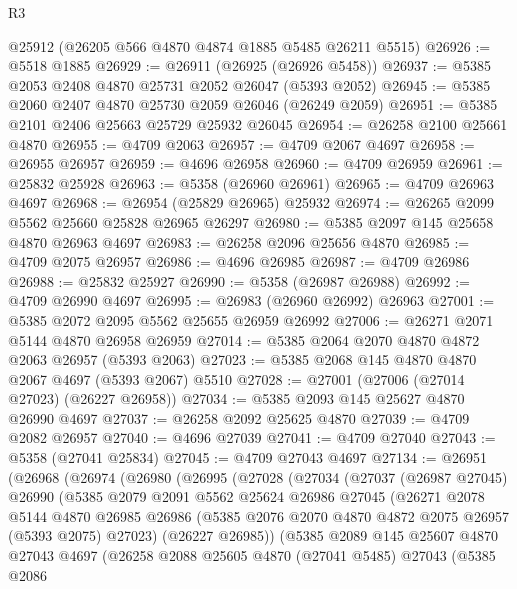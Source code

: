 \begin{lexlean}{R3}
\begin{coremodule}
    @25912
    (@26205 @566 @4870 @4874 @1885 @5485 @26211 @5515)
@26926 := @5518 @1885
@26929 := @26911 (@26925 (@26926 @5458))
@26937 := @5385 @2053 @2408 @4870 @25731 @2052 @26047 (@5393 @2052)
@26945 := @5385 @2060 @2407 @4870 @25730 @2059 @26046 (@26249 @2059)
@26951 := @5385 @2101 @2406 @25663 @25729 @25932 @26045
@26954 := @26258 @2100 @25661 @4870
@26955 := @4709 @2063
@26957 := @4709 @2067 @4697
@26958 := @26955 @26957
@26959 := @4696 @26958
@26960 := @4709 @26959
@26961 := @25832 @25928
@26963 := @5358 (@26960 @26961)
@26965 := @4709 @26963 @4697
@26968 := @26954 (@25829 @26965) @25932
@26974 := @26265 @2099 @5562 @25660 @25828 @26965 @26297
@26980 := @5385 @2097 @145 @25658 @4870 @26963 @4697
@26983 := @26258 @2096 @25656 @4870
@26985 := @4709 @2075 @26957
@26986 := @4696 @26985
@26987 := @4709 @26986
@26988 := @25832 @25927
@26990 := @5358 (@26987 @26988)
@26992 := @4709 @26990 @4697
@26995 := @26983 (@26960 @26992) @26963
@27001 := @5385 @2072 @2095 @5562 @25655 @26959 @26992
@27006 := @26271 @2071 @5144 @4870 @26958 @26959
@27014 := @5385 @2064 @2070 @4870 @4872 @2063 @26957 (@5393 @2063)
@27023 := @5385 @2068 @145 @4870 @4870 @2067 @4697 (@5393 @2067) @5510
@27028 := @27001 (@27006 (@27014 @27023) (@26227 @26958))
@27034 := @5385 @2093 @145 @25627 @4870 @26990 @4697
@27037 := @26258 @2092 @25625 @4870
@27039 := @4709 @2082 @26957
@27040 := @4696 @27039
@27041 := @4709 @27040
@27043 := @5358 (@27041 @25834)
@27045 := @4709 @27043 @4697
@27134 := @26951
    (@26968
      (@26974
        (@26980
          (@26995
            (@27028
              (@27034
                (@27037
                  (@26987 @27045)
                  @26990
                  (@5385
                    @2079
                    @2091
                    @5562
                    @25624
                    @26986
                    @27045
                    (@26271
                      @2078
                      @5144
                      @4870
                      @26985
                      @26986
                      (@5385 @2076 @2070 @4870 @4872 @2075 @26957 (@5393 @2075) @27023)
                      (@26227 @26985))
                    (@5385
                      @2089
                      @145
                      @25607
                      @4870
                      @27043
                      @4697
                      (@26258
                        @2088
                        @25605
                        @4870
                        (@27041 @5485)
                        @27043
                        (@5385
                          @2086

\end{coremodule}
\end{lexlean}

